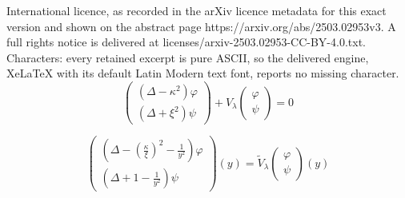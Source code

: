 \documentclass[10pt,a4paper]{amsart}
\begin{document}
International licence, as recorded in the arXiv licence metadata for this exact version and shown on the abstract page https://arxiv.org/abs/2503.02953v3. A full rights notice is delivered at licenses/arxiv-2503.02953-CC-BY-4.0.txt. Characters: every retained excerpt is pure ASCII, so the delivered engine, XeLaTeX with its default Latin Modern text font, reports no missing character.
  \begin{equation}
    \left(\begin{array}{c}
      (\Delta - \kappa^2) \varphi\\
      (\Delta + \xi^2) \psi
    \end{array}\right) + V_{\lambda} \left(\begin{array}{c}
      \varphi\\
      \psi
    \end{array}\right) = 0 \label{maineq3}
  \end{equation}

\begin{equation}
  \left(\begin{array}{c}
    \left( \Delta - \left( \frac{\kappa}{\xi} \right)^2 -
    \frac{1}{y^2} \right) \varphi\\
    \left( \Delta + 1 - \frac{1}{y^2} \right) \psi
  \end{array}\right) (y) = \widetilde{V}_{\lambda} \left(\begin{array}{c}
    \varphi\\
    \psi
  \end{array}\right) (y) \label{lydmor}
\end{equation}
\end{document}

